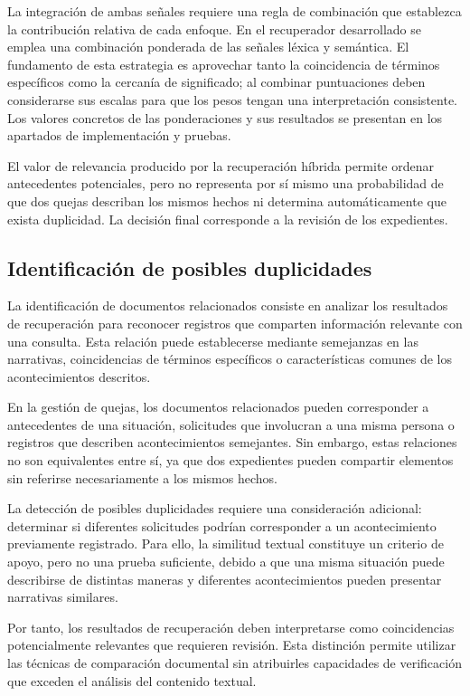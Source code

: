 La integración de ambas señales requiere una regla de combinación que establezca la contribución relativa de cada enfoque. En el recuperador desarrollado se emplea una combinación ponderada de las señales léxica y semántica. El fundamento de esta estrategia es aprovechar tanto la coincidencia de términos específicos como la cercanía de significado; al combinar puntuaciones deben considerarse sus escalas para que los pesos tengan una interpretación consistente. Los valores concretos de las ponderaciones y sus resultados se presentan en los apartados de implementación y pruebas.

El valor de relevancia producido por la recuperación híbrida permite ordenar antecedentes potenciales, pero no representa por sí mismo una probabilidad de que dos quejas describan los mismos hechos ni determina automáticamente que exista duplicidad. La decisión final corresponde a la revisión de los expedientes.

\subsection{Identificación de posibles duplicidades}

La identificación de documentos relacionados consiste en analizar los resultados de recuperación para reconocer registros que comparten información relevante con una consulta. Esta relación puede establecerse mediante semejanzas en las narrativas, coincidencias de términos específicos o características comunes de los acontecimientos descritos.

En la gestión de quejas, los documentos relacionados pueden corresponder a antecedentes de una situación, solicitudes que involucran a una misma persona o registros que describen acontecimientos semejantes. Sin embargo, estas relaciones no son equivalentes entre sí, ya que dos expedientes pueden compartir elementos sin referirse necesariamente a los mismos hechos.

La detección de posibles duplicidades requiere una consideración adicional: determinar si diferentes solicitudes podrían corresponder a un acontecimiento previamente registrado. Para ello, la similitud textual constituye un criterio de apoyo, pero no una prueba suficiente, debido a que una misma situación puede describirse de distintas maneras y diferentes acontecimientos pueden presentar narrativas similares.

Por tanto, los resultados de recuperación deben interpretarse como coincidencias potencialmente relevantes que requieren revisión. Esta distinción permite utilizar las técnicas de comparación documental sin atribuirles capacidades de verificación que exceden el análisis del contenido textual.

